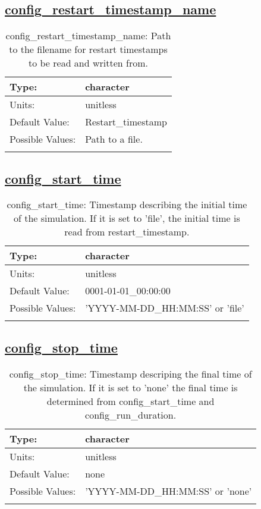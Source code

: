 \subsection[config\_restart\_timestamp\_name]{\hyperref[sec:nm_tab_time_management]{config\_restart\_timestamp\_name}}
\label{subsec:nm_sec_config_restart_timestamp_name}
\begin{center}
\begin{longtable}{| p{2.0in} || p{4.0in} |}
    \hline
    Type: & character \\
    \hline
    Units: & \si{unitless} \\
    \hline
    Default Value: & Restart\_timestamp \\
    \hline
    Possible Values: & Path to a file. \\
    \hline
    \caption{config\_restart\_timestamp\_name: Path to the filename for restart timestamps to be read and written from.}
\end{longtable}
\end{center}
\subsection[config\_start\_time]{\hyperref[sec:nm_tab_time_management]{config\_start\_time}}
\label{subsec:nm_sec_config_start_time}
\begin{center}
\begin{longtable}{| p{2.0in} || p{4.0in} |}
    \hline
    Type: & character \\
    \hline
    Units: & \si{unitless} \\
    \hline
    Default Value: & 0001-01-01\_00:00:00 \\
    \hline
    Possible Values: & 'YYYY-MM-DD\_HH:MM:SS' or 'file' \\
    \hline
    \caption{config\_start\_time: Timestamp describing the initial time of the simulation. If it is set to 'file', the initial time is read from restart\_timestamp.}
\end{longtable}
\end{center}
\subsection[config\_stop\_time]{\hyperref[sec:nm_tab_time_management]{config\_stop\_time}}
\label{subsec:nm_sec_config_stop_time}
\begin{center}
\begin{longtable}{| p{2.0in} || p{4.0in} |}
    \hline
    Type: & character \\
    \hline
    Units: & \si{unitless} \\
    \hline
    Default Value: & none \\
    \hline
    Possible Values: & 'YYYY-MM-DD\_HH:MM:SS' or 'none' \\
    \hline
    \caption{config\_stop\_time: Timestamp descriping the final time of the simulation. If it is set to 'none' the final time is determined from config\_start\_time and config\_run\_duration.}
\end{longtable}
\end{center}

